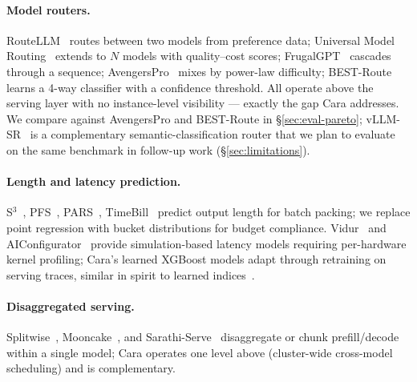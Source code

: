 \documentclass[10pt]{article}
\begin{document}
\paragraph{Model routers.} RouteLLM~\cite{Ong2024RouteLLMLT} routes between two models from preference data; Universal Model Routing~\cite{universal_model_routering} extends to $N$ models with quality--cost scores; FrugalGPT~\cite{chen2023frugalgpthowuse} cascades through a sequence; AvengersPro~\cite{avengers} mixes by power-law difficulty; BEST-Route~\cite{best_route} learns a 4-way classifier with a confidence threshold. All operate above the serving layer with no instance-level visibility — exactly the gap Cara addresses. We compare against AvengersPro and BEST-Route in §\ref{sec:eval-pareto}; vLLM-SR~\cite{semantic_router} is a complementary semantic-classification router that we plan to evaluate on the same benchmark in follow-up work (§\ref{sec:limitations}).

\paragraph{Length and latency prediction.} S$^3$~\cite{s3}, PFS~\cite{Gong_2025}, PARS~\cite{pars}, TimeBill~\cite{timebill2025} predict output length for batch packing; we replace point regression with bucket distributions for budget compliance. Vidur~\cite{Agrawal2024VidurAL} and AIConfigurator~\cite{aiconfigurator2025} provide simulation-based latency models requiring per-hardware kernel profiling; Cara's learned XGBoost models adapt through retraining on serving traces, similar in spirit to learned indices~\cite{kraska2018case}.

\paragraph{Disaggregated serving.} Splitwise~\cite{splitwise}, Mooncake~\cite{mooncake}, and Sarathi-Serve~\cite{sarathi_serve} disaggregate or chunk prefill/decode within a single model; Cara operates one level above (cluster-wide cross-model scheduling) and is complementary.
\end{document}
